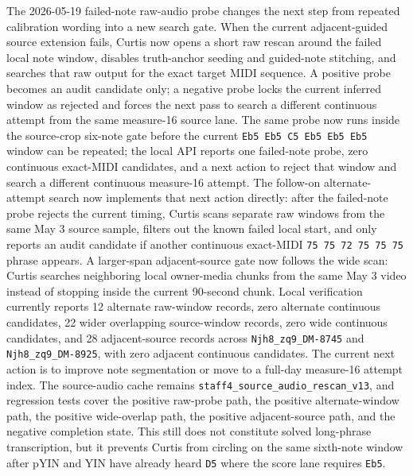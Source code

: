 \documentclass[12pt,letterpaper]{article}
\begin{document}
The 2026-05-19 failed-note raw-audio probe changes the next step from repeated calibration wording into a new search gate. When the current adjacent-guided source extension fails, Curtis now opens a short raw rescan around the failed local note window, disables truth-anchor seeding and guided-note stitching, and searches that raw output for the exact target MIDI sequence. A positive probe becomes an audit candidate only; a negative probe locks the current inferred window as rejected and forces the next pass to search a different continuous attempt from the same measure-16 source lane. The same probe now runs inside the source-crop six-note gate before the current \texttt{Eb5 Eb5 C5 Eb5 Eb5 Eb5} window can be repeated; the local API reports one failed-note probe, zero continuous exact-MIDI candidates, and a next action to reject that window and search a different continuous measure-16 attempt. The follow-on alternate-attempt search now implements that next action directly: after the failed-note probe rejects the current timing, Curtis scans separate raw windows from the same May 3 source sample, filters out the known failed local start, and only reports an audit candidate if another continuous exact-MIDI \texttt{75 75 72 75 75 75} phrase appears. A larger-span adjacent-source gate now follows the wide scan: Curtis searches neighboring local owner-media chunks from the same May 3 video instead of stopping inside the current 90-second chunk. Local verification currently reports 12 alternate raw-window records, zero alternate continuous candidates, 22 wider overlapping source-window records, zero wide continuous candidates, and 28 adjacent-source records across \texttt{Njh8\_zq9\_DM-8745} and \texttt{Njh8\_zq9\_DM-8925}, with zero adjacent continuous candidates. The current next action is to improve note segmentation or move to a full-day measure-16 attempt index. The source-audio cache remains \texttt{staff4\_source\_audio\_rescan\_v13}, and regression tests cover the positive raw-probe path, the positive alternate-window path, the positive wide-overlap path, the positive adjacent-source path, and the negative completion state. This still does not constitute solved long-phrase transcription, but it prevents Curtis from circling on the same sixth-note window after pYIN and YIN have already heard \texttt{D5} where the score lane requires \texttt{Eb5}.
\end{document}
